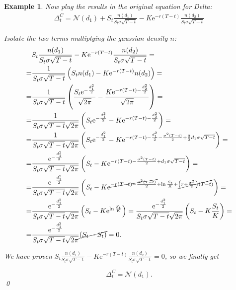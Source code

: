 \documentclass[oneside,titlepage,headinclude,12pt,a4paper,BCOR5mm,footinclude]{book}
\theoremstyle{defn}
\newtheorem{example}{Example}
\newcommand{\eexp}{\mathrm{e}}
\newcommand\NN{\mathcal{N}}
\begin{document}
\begin{example}
  Now plug the results in the original equation for Delta:
  \begin{align*}
    \Delta^C_t = \NN(d_1) + S_t \frac{n(d_1)}{S_t\sigma\sqrt{T-t}} - K\eexp^{-r(T-t)}\frac{n(d_2)}{S_t\sigma\sqrt{T-t}}
  \end{align*}

  Isolate the two terms multiplying the gaussian density $n$:
  \begin{align*}
    & S_t \frac{n(d_1)}{S_t\sigma\sqrt{T-t}} - K\eexp^{-r(T-t)}\frac{n(d_2)}{S_t\sigma\sqrt{T-t}} =
    \\=& \frac{1}{S_t\sigma\sqrt{T-t}} \left( S_t n(d_1) - K\eexp^{-r(T-t)}n(d_2)\right) =
    \\=& \frac{1}{S_t\sigma\sqrt{T-t}} \left( \frac{S_t \eexp^{-\frac{d_1^2}{2}}}{\sqrt{2\pi}} 
    - \frac{K\eexp^{-r(T-t) -\frac{d_2^2}{2}}}{\sqrt{2\pi}}\right) =
    \\=& \frac{1}{S_t\sigma\sqrt{T-t}\sqrt{2\pi}} \left( S_t \eexp^{-\frac{d_1^2}{2}} - K\eexp^{-r(T-t) -\frac{d_2^2}{2}} \right) =
    \\=& \frac{1}{S_t\sigma\sqrt{T-t}\sqrt{2\pi}} \left( S_t \eexp^{-\frac{d_1^2}{2}} - K\eexp^{-r(T-t) - \frac{d_1^2}{2} - \frac{\sigma^2(T-t)}{2} + \frac{2}{2}d_1\sigma\sqrt{T-t}} \right) =
    \\=& \frac{\eexp^{-\frac{d_1^2}{2}}}{S_t\sigma\sqrt{T-t}\sqrt{2\pi}}\left( S_t - K\eexp^{-r(T-t) -\frac{\sigma^2(T-t)}{2} + d_1\sigma\sqrt{T-t}}\right) =
    \\=& \frac{\eexp^{-\frac{d_1^2}{2}}}{S_t\sigma\sqrt{T-t}\sqrt{2\pi}}\left( S_t - K\eexp^{\cancel{-r(T-t) -\frac{\sigma^2(T-t)}{2}} + \ln\frac{S_t}{K} + \cancel{\left( r + \frac{\sigma^2}{2}\right)(T-t)}}\right) =
    \\=& \frac{\eexp^{-\frac{d_1^2}{2}}}{S_t\sigma\sqrt{T-t}\sqrt{2\pi}}\left( S_t - K\eexp^{\ln\frac{S_t}{K}}\right)
    = \frac{\eexp^{-\frac{d_1^2}{2}}}{S_t\sigma\sqrt{T-t}\sqrt{2\pi}}\left( S_t - K\frac{S_t}{K}\right) =
    \\=& \frac{\eexp^{-\frac{d_1^2}{2}}}{S_t\sigma\sqrt{T-t}\sqrt{2\pi}}\cancel{\left( S_t - S_t\right)} = 0.
  \end{align*}

  We     have      proven     $S_t      \frac{n(d_1)}{S_t\sigma\sqrt{T-t}}     -
  K\eexp^{-r(T-t)}\frac{n(d_2)}{S_t\sigma\sqrt{T-t}} = 0$, so we finally get

  \[
    \Delta^C_t = \NN(d_1).
  \]
  \qed

\end{example}
\end{document}
